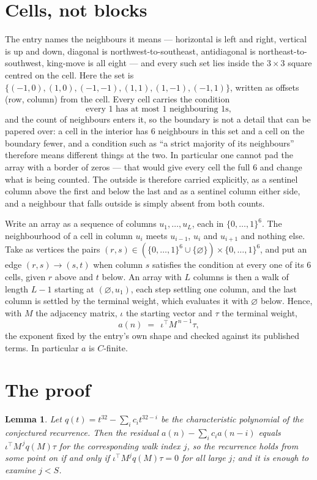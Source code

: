 \documentclass[11pt,a4paper]{article}
\theoremstyle{plain}
\newtheorem{lemma}[theorem]{Lemma}
\theoremstyle{definition}
\begin{document}
\section{Cells, not blocks}

The entry names the neighbours it means --- horizontal is left and right, vertical is up and
down, diagonal is northwest-to-southeast, antidiagonal is northeast-to-southwest, king-move is
all eight --- and every such set lies inside the $3\times3$ square centred on the cell. Here
the set is $\{(-1,0), (1,0), (-1,-1), (1,1), (1,-1), (-1,1)\}$, written as offsets (row, column) from the cell. Every cell carries
the condition
\[
\text{every 1 has at most 1 neighbouring 1s},
\]
and the count of neighbours enters it, so the boundary is not a detail that can be papered
over: a cell in the interior has $6$ neighbours in this set and a cell on the boundary
fewer, and a condition such as ``a strict majority of its neighbours'' therefore means
different things at the two. In particular one cannot pad the array with a border of zeros ---
that would give every cell the full $6$ and change what is being counted. The outside is
therefore carried
explicitly, as a sentinel column above the first and below the last and as a sentinel column
either side, and a neighbour that falls outside is simply absent from both counts.

Write an array as a sequence of columns $u_1,\dots,u_L$, each in
$\{0,\dots,1\}^{6}$. The neighbourhood of a cell in column $u_i$ meets $u_{i-1}$,
$u_i$ and $u_{i+1}$ and nothing else. Take as vertices the pairs
$(r,s)\in(\{0,\dots,1\}^{6}\cup\{\varnothing\})\times\{0,\dots,1\}^{6}$,
and put an edge $(r,s)\to(s,t)$ when column $s$ satisfies the condition at every one of its
$6$ cells, given $r$ above and $t$ below. An array with $L$ columns is then a walk of length
$L-1$ starting at $(\varnothing,u_1)$, each step settling one column, and the last column is
settled by the terminal weight, which evaluates it with $\varnothing$ below. Hence,
with $M$ the adjacency matrix, $\iota$ the starting vector and $\tau$ the terminal weight,
\[
a(n)\;=\;\,\iota^{\!\top}M^{\,n-1}\tau ,
\]
the exponent fixed by the entry's own shape and checked against its published terms. In
particular $a$ is $C$-finite.

\section{The proof}

\begin{lemma}\label{lem:crit}
Let $q(t)=t^{32}-\sum_i c_it^{32-i}$ be the characteristic polynomial of the
conjectured recurrence. Then the residual $a(n)-\sum_ic_ia(n-i)$ equals
$\iota^{\!\top}M^{\,j}q(M)\tau$ for the corresponding walk index $j$, so the
recurrence holds from some point on if and only if $\iota^{\!\top}M^{j}q(M)\tau=0$ for all
large $j$; and it is enough to examine $j<S$.
\end{lemma}
\end{document}

